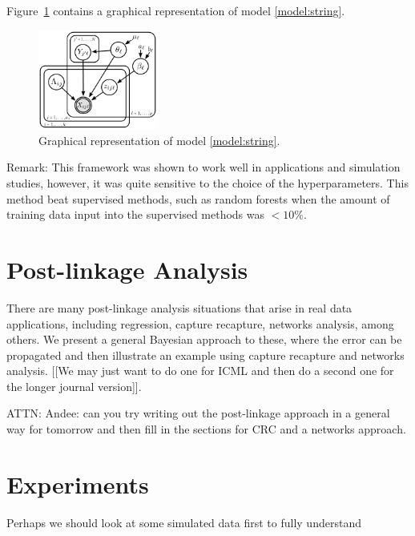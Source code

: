 \documentclass[twoside]{article}
\begin{document}
Figure~\ref{fig:graphicalProcess} contains a graphical representation of model \ref{model:string}.

\begin{figure}[htbp]
\begin{center}
\includegraphics[width=0.35\textwidth]{figures/recordLinkage_graphicalModel}
\caption{Graphical representation of model \ref{model:string}.}
\label{fig:graphicalProcess}
\end{center}
\end{figure}

Remark: This framework was shown to work well in applications and simulation studies, however, it was quite sensitive to the choice of the hyperparameters. This method  beat supervised methods, such as random forests when the amount of training data input into the supervised methods was $< 10\%$. 

\section{Post-linkage Analysis}
There are many post-linkage analysis situations that arise in real data applications, including regression, capture recapture, networks analysis, among others. 
We present a general Bayesian approach to these, where the error can be propagated and then illustrate an example using capture recapture and networks analysis. [[We may just want to do one for ICML and then do a second one for the longer journal version]].

ATTN: Andee: can you try writing out the post-linkage approach in a general way for tomorrow and then fill in the sections for CRC and a networks approach. 

\section{Experiments} 
\label{sec:experiments}

Perhaps we should look at some simulated data first to fully understand 
\end{document}
